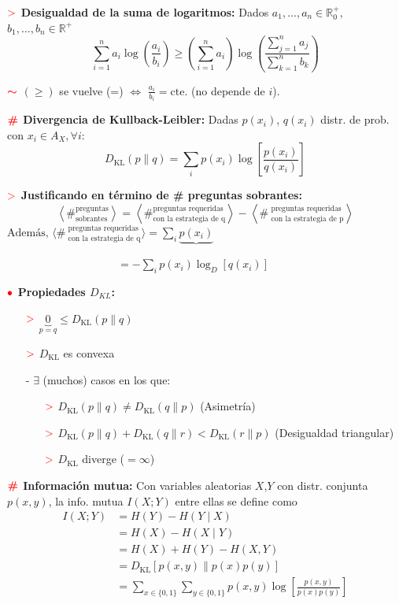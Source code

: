 \documentclass[%
 reprint,
 amsmath,amssymb,
 aps,
]{revtex4-1}
\begin{document}
\textbf{$\textcolor{red}{\mathbf{>}}$ Desigualdad de la suma de logaritmos:} Dados $a_{1}, \ldots, a_{n} \in \mathbb{R}^+_0$, $b_{1}, \ldots, b_{n} \in \mathbb{R}^+$
$$
\sum_{i=1}^{n} a_{i} \log \left(\frac{a_{i}}{b_{i}}\right) \geq\left(\sum_{i=1}^{n} a_{i}\right) \log \left(\frac{\sum_{j=1}^{n} a_{j}}{\sum_{k=1}^{n} b_{k}}\right)
$$

\textbf{$\textcolor{red}{\color{red}{\boldsymbol{\sim}}}$} 
$(\geq)$ se vuelve (=) $\Leftrightarrow$ $\frac{a_{i}}{b_{i}} = \text{cte.}$ (no depende de $i$).

\textbf{$\color{red}{\textbf{\#}}$ Divergencia de Kullback-Leibler:}
Dadas $p\left(x_{i}\right)$, $q\left(x_{i}\right)$ distr. de prob. con $x_i \in A_X, \forall i$:
$$
D_{\mathrm{KL}}(p \| q)=\sum_{i} p\left(x_{i}\right) \log \left[\frac{p\left(x_{i}\right)}{q\left(x_{i}\right)}\right]
$$

\textbf{$\textcolor{red}{\mathbf{>}}$ Justificando en término de \# preguntas sobrantes:}
$$
\left\langle
\#
^\text {preguntas} _\text{sobrantes}
\right\rangle
=
\left\langle
\#
^\text {preguntas requeridas}
_\text {con la estrategia de q}
\right\rangle
-
\left\langle
\# 
^\text { preguntas requeridas }
_\text { con la estrategia de p}
\right\rangle
$$
$ \text{Además, }
\langle
\# 
^\text { preguntas requeridas }
_\text { con la estrategia de q}
\rangle 
=
\sum_{i} \underbrace{p\left(x_{i}\right)}$

$\qquad \qquad \qquad \qquad \qquad =-\sum_{i} p\left(x_{i}\right) \log _{D}\left[q\left(x_{i}\right)\right]$

\textbf{$\color{red}{\bullet}$ Propiedades $D_{KL}$: }

\begin{enumerate}
  \item[$\textcolor{red}{\mathbf{>}}$] $\underbrace{0}_{p=q} \leq D_{\mathrm{KL}}(p \| q)$
  \item[$\textcolor{red}{\mathbf{>}}$] $D_{\mathrm{KL}}$ es convexa

  \item[-] $\exists$ (muchos) casos en los que:
  \begin{itemize}
    \item[$\textcolor{red}{\mathbf{>}}$] $D_{\mathrm{KL}}(p \| q) \neq D_{\mathrm{KL}}(q \| p)$ (Asimetría) 
    \item[$\textcolor{red}{\mathbf{>}}$] $D_{\mathrm{KL}}(p \| q)+D_{\mathrm{KL}}(q \| r)<D_{\mathrm{KL}}(r \| p)$ (Desigualdad triangular)
    \item[$\textcolor{red}{\mathbf{>}}$] $D_{\mathrm{KL}}$ diverge ($=\infty$)
  \end{itemize}
\end{enumerate}

\textbf{$\color{red}{\textbf{\#}}$ Información mutua:} 
Con variables aleatorias $X$,$Y$ con distr. conjunta $p(x, y)$, la info.
mutua $I(X ; Y)$ entre ellas se define como
$$
\begin{aligned}
I(X ; Y) &=H(Y)-H(Y \mid X) \\
&=H(X)-H(X \mid Y) \\
&=H(X)+H(Y)-H(X, Y) \\
&=D_{\mathrm{KL}}[p(x, y) \| p(x) p(y)] \\
&=\sum_{x \in\{0,1\}} \sum_{y \in\{0,1\}} p(x, y) \log \left[\frac{p(x, y)}{p(x) p(y)}\right]
\end{aligned}
$$
\end{document}
